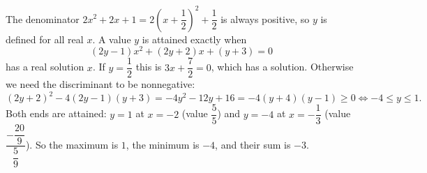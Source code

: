 The denominator $2x^2+2x+1=2\left(x+\dfrac{1}{2}\right)^2+\dfrac{1}{2}$ is always positive, so $y$ is defined for all real $x$. A value $y$ is attained exactly when
\[
(2y-1)x^2+(2y+2)x+(y+3)=0
\]
has a real solution $x$. If $y=\dfrac{1}{2}$ this is $3x+\dfrac{7}{2}=0$, which has a solution. Otherwise we need the discriminant to be nonnegative:
\[
(2y+2)^2-4(2y-1)(y+3)=-4y^2-12y+16=-4(y+4)(y-1)\ge0\iff-4\le y\le1 .
\]
Both ends are attained: $y=1$ at $x=-2$ (value $\dfrac{5}{5}$) and $y=-4$ at $x=-\dfrac{1}{3}$ (value $\dfrac{-\dfrac{20}{9}}{\dfrac{5}{9}}$). So the maximum is $1$, the minimum is $-4$, and their sum is $\boxed{-3}$.

